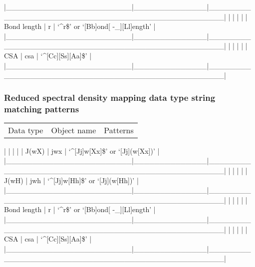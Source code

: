 |\_\_\_\_\_\_\_\_\_\_\_\_\_\_\_\_\_\_\_\_\_\_\_\_|\_\_\_\_\_\_\_\_\_\_\_\_\_\_|\_\_\_\_\_\_\_\_\_\_\_\_\_\_\_\_\_\_\_\_\_\_\_\_\_\_\_\_\_\_\_\_\_\_\_\_\_\_\_\_\_\_\_\_\_\_\_\_\_\_|
|                        |              |                                                  |
| Bond length            | r            | `\^{}r\$' or `[Bb]ond[ -\_][Ll]ength'                 |
|\_\_\_\_\_\_\_\_\_\_\_\_\_\_\_\_\_\_\_\_\_\_\_\_|\_\_\_\_\_\_\_\_\_\_\_\_\_\_|\_\_\_\_\_\_\_\_\_\_\_\_\_\_\_\_\_\_\_\_\_\_\_\_\_\_\_\_\_\_\_\_\_\_\_\_\_\_\_\_\_\_\_\_\_\_\_\_\_\_|
|                        |              |                                                  |
| CSA                    | csa          | `\^{}[Cc][Ss][Aa]\$'                                 |
|\_\_\_\_\_\_\_\_\_\_\_\_\_\_\_\_\_\_\_\_\_\_\_\_|\_\_\_\_\_\_\_\_\_\_\_\_\_\_|\_\_\_\_\_\_\_\_\_\_\_\_\_\_\_\_\_\_\_\_\_\_\_\_\_\_\_\_\_\_\_\_\_\_\_\_\_\_\_\_\_\_\_\_\_\_\_\_\_\_|




\subsubsection{Reduced spectral density mapping data type string matching patterns}



\begin{tabular}{ccc}
Data type & Object name & Patterns \\
\end{tabular}
|                        |              |                                                  |
| J(wX)                  | jwx          | `\^{}[Jj]w[Xx]\$' or `[Jj](w[Xx])'                   |
|\_\_\_\_\_\_\_\_\_\_\_\_\_\_\_\_\_\_\_\_\_\_\_\_|\_\_\_\_\_\_\_\_\_\_\_\_\_\_|\_\_\_\_\_\_\_\_\_\_\_\_\_\_\_\_\_\_\_\_\_\_\_\_\_\_\_\_\_\_\_\_\_\_\_\_\_\_\_\_\_\_\_\_\_\_\_\_\_\_|
|                        |              |                                                  |
| J(wH)                  | jwh          | `\^{}[Jj]w[Hh]\$' or `[Jj](w[Hh])'                   |
|\_\_\_\_\_\_\_\_\_\_\_\_\_\_\_\_\_\_\_\_\_\_\_\_|\_\_\_\_\_\_\_\_\_\_\_\_\_\_|\_\_\_\_\_\_\_\_\_\_\_\_\_\_\_\_\_\_\_\_\_\_\_\_\_\_\_\_\_\_\_\_\_\_\_\_\_\_\_\_\_\_\_\_\_\_\_\_\_\_|
|                        |              |                                                  |
| Bond length            | r            | `\^{}r\$' or `[Bb]ond[ -\_][Ll]ength'                 |
|\_\_\_\_\_\_\_\_\_\_\_\_\_\_\_\_\_\_\_\_\_\_\_\_|\_\_\_\_\_\_\_\_\_\_\_\_\_\_|\_\_\_\_\_\_\_\_\_\_\_\_\_\_\_\_\_\_\_\_\_\_\_\_\_\_\_\_\_\_\_\_\_\_\_\_\_\_\_\_\_\_\_\_\_\_\_\_\_\_|
|                        |              |                                                  |
| CSA                    | csa          | `\^{}[Cc][Ss][Aa]\$'                                 |
|\_\_\_\_\_\_\_\_\_\_\_\_\_\_\_\_\_\_\_\_\_\_\_\_|\_\_\_\_\_\_\_\_\_\_\_\_\_\_|\_\_\_\_\_\_\_\_\_\_\_\_\_\_\_\_\_\_\_\_\_\_\_\_\_\_\_\_\_\_\_\_\_\_\_\_\_\_\_\_\_\_\_\_\_\_\_\_\_\_|


